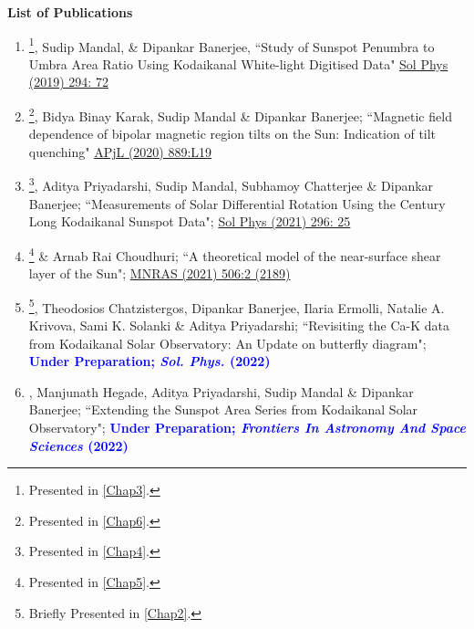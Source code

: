 \begin{center}{\huge\bf List of Publications}\end{center}
\begin{enumerate}

    \item \footnote{Presented in \cref{Chap3}.}, Sudip Mandal, \& Dipankar Banerjee, ``Study of Sunspot Penumbra to Umbra Area Ratio Using Kodaikanal White-light Digitised Data" \href{https://doi.org/10.1007/s11207-019-1462-2}{ Sol Phys (2019) 294: 72}
    
    \item \footnote{Presented in \cref{Chap6}.}, Bidya Binay Karak, Sudip Mandal \& Dipankar Banerjee; ``Magnetic field dependence of bipolar magnetic region tilts on the Sun: Indication of tilt quenching" \href{https://ui.adsabs.harvard.edu/abs/2019arXiv191213223J/abstract}{APjL (2020) 889:L19}
    
    
    \item \footnote{Presented in \cref{Chap4}.}, Aditya Priyadarshi, Sudip Mandal, Subhamoy Chatterjee \& Dipankar Banerjee; ``Measurements of Solar Differential Rotation Using the Century Long Kodaikanal Sunspot Data"; \href{https://ui.adsabs.harvard.edu/abs/2021SoPh..296...25J/abstract}{Sol Phys (2021) 296: 25}
    
    \item  \footnote{Presented in \cref{Chap5}.} \& Arnab Rai Choudhuri; ``A theoretical model of the near-surface shear layer of the Sun"; \href{https://ui.adsabs.harvard.edu/abs/2021MNRAS.tmp.1557J/abstract}{MNRAS (2021) 506:2 (2189)}
    
    \item \footnote{Briefly Presented in \cref{Chap2}.}, Theodosios Chatzistergos, Dipankar Banerjee, Ilaria Ermolli, Natalie A. Krivova, Sami K. Solanki \& Aditya Priyadarshi; ``Revisiting the Ca-K data from Kodaikanal Solar Observatory: An Update on butterfly diagram"; \textcolor{blue}{\bf Under Preparation; {\it Sol. Phys.} (2022)}
    
    \item \footnotemark[\value{footnote}], Manjunath Hegade, Aditya Priyadarshi, Sudip Mandal \& Dipankar Banerjee; ``Extending the Sunspot Area Series from Kodaikanal Solar Observatory"; \textcolor{blue}{\bf Under Preparation; {\it Frontiers In Astronomy And Space Sciences} (2022)}
    

\end{enumerate}
